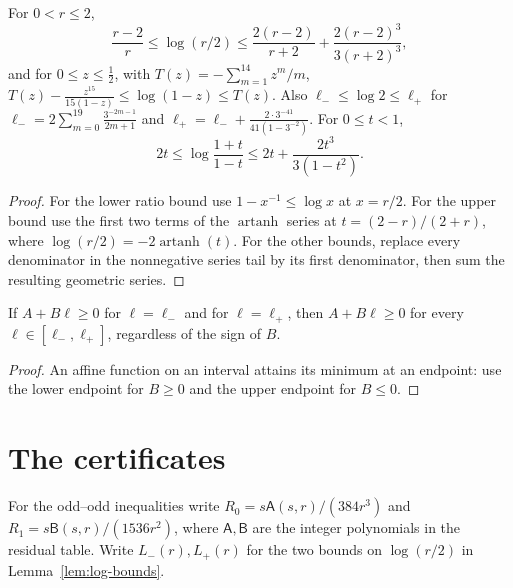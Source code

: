 \begin{lemma}
\label{lem:log-bounds}
\leanok
For $0<r\le2$,
\[
  \frac{r-2}r\le\log(r/2)\le\frac{2(r-2)}{r+2}+\frac{2(r-2)^3}{3(r+2)^3},
\]
and for $0\le z\le\tfrac12$, with $T(z)=-\sum_{m=1}^{14}z^m/m$,
$T(z)-\frac{z^{15}}{15(1-z)}\le\log(1-z)\le T(z)$. Also
$\ell_-\le\log2\le\ell_+$ for $\ell_-=2\sum_{m=0}^{19}\frac{3^{-2m-1}}{2m+1}$
and $\ell_+=\ell_-+\frac{2\cdot3^{-41}}{41(1-3^{-2})}$.
For $0\le t<1$,
\[
  2t\le\log\frac{1+t}{1-t}\le 2t+\frac{2t^3}{3(1-t^2)}.
\]
\end{lemma}

\begin{proof}
\leanok
For the lower ratio bound use $1-x^{-1}\le\log x$ at $x=r/2$. For the upper
bound use the first two terms of the $\operatorname{artanh}$ series at
$t=(2-r)/(2+r)$, where $\log(r/2)=-2\operatorname{artanh}(t)$.
For the other bounds, replace every denominator in the nonnegative series
tail by its first denominator, then sum the resulting geometric series.
\end{proof}

\begin{lemma}
\label{lem:affine-in-log}
\leanok
If $A+B\ell\ge0$ for $\ell=\ell_-$ and for $\ell=\ell_+$, then $A+B\ell\ge0$ for
every $\ell\in[\ell_-,\ell_+]$, regardless of the sign of $B$.
\end{lemma}

\begin{proof}
\leanok
An affine function on an interval attains its minimum at an endpoint:
use the lower endpoint for $B\ge0$ and the upper endpoint for $B\le0$.
\end{proof}

\section{The certificates}

For the odd--odd inequalities write
$R_0=s\mathsf A(s,r)/(384r^3)$ and $R_1=s\mathsf B(s,r)/(1536r^2)$,
where $\mathsf A,\mathsf B$ are the integer polynomials in the residual table.
Write $L_-(r),L_+(r)$ for the two bounds on $\log(r/2)$ in
Lemma~\ref{lem:log-bounds}.

